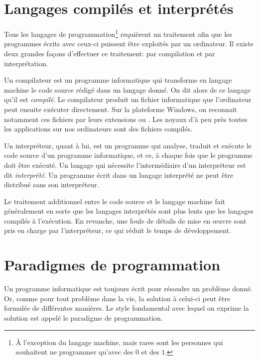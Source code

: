 \section{Langages compilés et interprétés}
\label{sec:informatique:compile_vs_interprete}

Tous les langages de programmation\footnote{%
  À l'exception du langage machine, mais rares sont les personnes qui
  souhaitent ne programmer qu'avec des $0$ et des $1$.} %
requièrent un traitement afin que les programmes écrits avec ceux-ci
puissent être exploités par un ordinateur. Il existe deux grandes
façons d'effectuer ce traitement: par compilation et par
interprétation.

Un compilateur est un programme informatique qui
transforme en langage machine le code source rédigé dans un langage
donné. On dit alors de ce langage qu'il est \emph{compilé}. Le compilateur produit un fichier
informatique que l'ordinateur peut ensuite exécuter directement. Sur
la plateforme Windows, on reconnait notamment ces fichiers par leurs
extensions  ou . Les noyaux d'à peu près toutes
les applications sur nos ordinateurs sont des fichiers compilés.

Un interpréteur, quant à lui, est un programme qui
analyse, traduit et exécute le code source d'un programme
informatique, et ce, à chaque fois que le programme doit être exécuté.
Un langage qui nécessite l'intermédiaire d'un interpréteur est dit
\emph{interprété}. Un programme écrit dans un langage interprété ne peut être distribué sans son
interpréteur.

Le traitement additionnel entre le code source et le langage machine
fait généralement en sorte que les langages interprétés sont plus
lents que les langages compilés à l'exécution. En revanche, une foule
de détails de mise en œuvre sont pris en charge par l'interpréteur, ce
qui réduit le temps de développement.


\section{Paradigmes de programmation}
\label{sec:informatique:paradigmes}

Un programme informatique est toujours écrit pour résoudre un problème
donné. Or, comme pour tout problème dans la vie, la solution à
celui-ci peut être formulée de différentes manières. Le style
fondamental avec lequel on exprime la solution est appelé le
paradigme de programmation.

